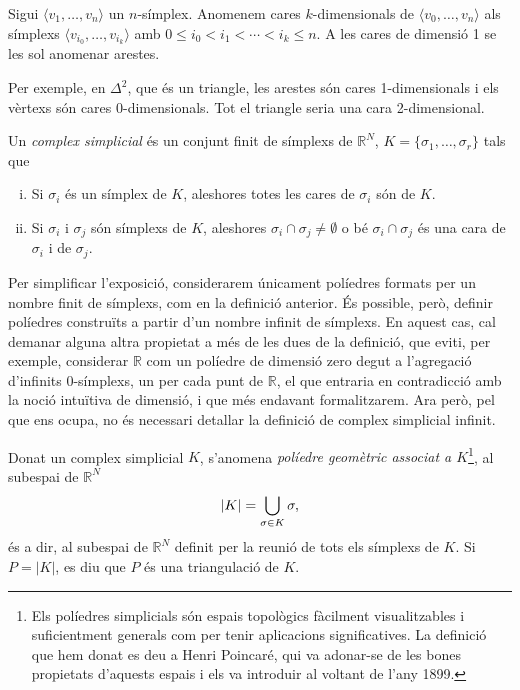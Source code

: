 \documentclass[../main.tex]{subfiles}
\begin{document}
\begin{defi}
 Sigui $\langle v_1,\ldots,v_n\rangle$ un $n$-símplex. Anomenem cares $k$-dimensionals de $\langle v_0,\ldots,v_n\rangle$ als símplexs $\langle v_{i_0},\ldots,v_{i_k}\rangle$ amb $0\leq i_0<i_1<\cdots<i_k\leq n$. A les cares de dimensió 1 se les sol anomenar arestes.
\end{defi}

Per exemple, en $\Delta^2$, que és un triangle, les arestes són cares 1-dimensionals i els vèrtexs són cares 0-dimensionals. Tot el triangle seria una cara 2-dimensional.

\begin{defi}
\label{def:complexsimplicial} Un \textit{complex simplicial} és un conjunt finit de símplexs de $\mathbb{R}^N$, $K=\{\sigma_1,\ldots,\sigma_r\}$ tals que
\begin{enumerate}[(i)]
    \item Si $\sigma_i$ és un símplex de $K$, aleshores totes les cares de $\sigma_i$ són de $K$.
    \item Si $\sigma_i$ i $\sigma_j$ són símplexs de $K$, aleshores $\sigma_i\cap\sigma_j\not=\emptyset$ o bé $\sigma_i\cap\sigma_j$ és una cara de $\sigma_i$ i de $\sigma_j$.
\end{enumerate}
\end{defi}

Per simplificar l'exposició, considerarem únicament políedres formats per un nombre finit de símplexs, com en la definició anterior. És possible, però, definir políedres construïts a partir d'un nombre infinit de símplexs. En aquest cas, cal demanar alguna altra propietat a més de les dues de la definició, que eviti, per exemple, considerar $\mathbb{R}$ com un políedre de dimensió zero degut a l'agregació d'infinits $0$-símplexs, un per cada punt de $\mathbb{R}$, el que entraria en contradicció amb la noció intuïtiva de dimensió, i que més endavant formalitzarem. Ara però, pel que ens ocupa, no és necessari detallar la definició de complex simplicial infinit.


\begin{defi}
\label{def:poliedregeometric} Donat un complex simplicial $K$, s'anomena \textit{políedre geomètric associat a $K$}\footnote{Els políedres simplicials són espais topològics fàcilment visualitzables i suficientment generals com per tenir aplicacions significatives. La definició que hem donat es deu a Henri Poincaré, qui va adonar-se de les bones propietats d'aquests espais i els va introduir al voltant de l'any 1899.}, al subespai de $\mathbb{R}^N$
\begin{equation}
    \notag
    |K| = \bigcup_{\sigma\in K}\sigma,
\end{equation}
és a dir, al subespai de $\mathbb{R}^N$ definit per la reunió de tots els símplexs de $K$. Si $P = |K|$, es diu que $P$ és una triangulació de $K$.
\end{defi}
\end{document}
